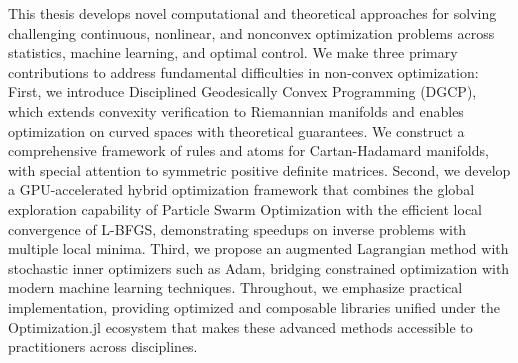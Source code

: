 %
%

This thesis develops novel computational and theoretical approaches for solving challenging continuous, nonlinear, and nonconvex optimization problems across statistics, machine learning, and optimal control. We make three primary contributions to address fundamental difficulties in non-convex optimization: First, we introduce Disciplined Geodesically Convex Programming (DGCP), which extends convexity verification to Riemannian manifolds and enables optimization on curved spaces with theoretical guarantees. We construct a comprehensive framework of rules and atoms for Cartan-Hadamard manifolds, with special attention to symmetric positive definite matrices. Second, we develop a GPU-accelerated hybrid optimization framework that combines the global exploration capability of Particle Swarm Optimization with the efficient local convergence of L-BFGS, demonstrating speedups on inverse problems with multiple local minima. Third, we propose an augmented Lagrangian method with stochastic inner optimizers such as Adam, bridging constrained optimization with modern machine learning techniques. Throughout, we emphasize practical implementation, providing optimized and composable libraries unified under the Optimization.jl ecosystem that makes these advanced methods accessible to practitioners across disciplines.